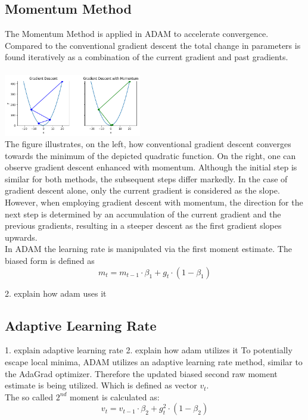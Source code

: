 \documentclass[journal]{IEEEtran}
\begin{document}
\subsection{Momentum Method}
The Momentum Method is applied in ADAM to accelerate convergence. Compared to the conventional gradient descent the total change in parameters is found iteratively as a combination of the current gradient and past gradients. \\\\
\includegraphics[width=0.45\textwidth]{report/figures/GD_momentum.png}\\
The figure illustrates, on the left, how conventional gradient descent converges towards the minimum of the depicted quadratic function. On the right, one can observe gradient descent enhanced with momentum. Although the initial step is similar for both methods, the subsequent steps differ markedly. In the case of gradient descent alone, only the current gradient is considered as the slope. However, when employing gradient descent with momentum, the direction for the next step is determined by an accumulation of the current gradient and the previous gradients, resulting in a steeper descent as the first gradient slopes upwards.\\
In ADAM the learning rate is manipulated via the first moment estimate. The biased form is defined as $$m_t=m_{t-1}\cdot \beta_1 + g_t\cdot (1-\beta_1)$$

2. explain how adam uses it



\subsection{Adaptive Learning Rate}
1. explain adaptive learning rate
2. explain how adam utilizes it
To potentially escape local minima, ADAM utilizes an adaptive learning rate method, similar to the AdaGrad optimizer. Therefore the updated biased second raw moment estimate is being utilized. Which is defined as vector $v_t$.\\

The so called $2^{nd}$ moment is calculated as:
$$v_t = v_{t-1} \cdot \beta_2 + g_t^2 \cdot (1-\beta_2)$$
\end{document}
